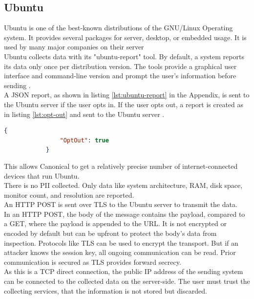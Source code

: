     \subsection{Ubuntu}
        Ubuntu is one of the best-known distributions of the GNU/Linux Operating system. It provides several packages for server, desktop, or embedded usage. It is used by many major companies on their server \cite{canonical_enterprise_nodate}\\
        Ubuntu collects data with its "ubuntu-report" tool. By default, a system reports its data only once per distribution version. The tools provide a graphical user interface and command-line version and prompt the user's information before sending \cite{roche_ubuntuubuntu-report_2020}.\\
        A JSON report, as shown in listing \ref{lst:ubuntu-report} in the Appendix, is sent to the Ubuntu server if the user opts in. If the user opts out, a report is created as in listing \ref{lst:opt-out} and sent to the Ubuntu server \cite{roche_ubuntuubuntu-report_2020}.\\ 
        \begin{lstlisting}[language=json, caption=JSON report on opt out, label=lst:opt-out]
            {
                "OptOut": true
            }
        \end{lstlisting}
        This allows Canonical to get a relatively precise number of internet-connected devices that run Ubuntu.\\
        There is no PII collected. Only data like system architecture, RAM, disk space, monitor count, and resolution are reported.\\
        An HTTP POST is sent over TLS to the Ubuntu server to transmit the data.\\
        
        In an HTTP POST, the body of the message contains the payload, compared to a GET, where the payload is appended to the URL.
        It is not encrypted or encoded by default but can be upfront to protect the body's data from inspection. Protocols like TLS can be used to encrypt the transport. But if an attacker knows the session key, all ongoing communication can be read. Prior communication is secured as TLS provides forward secrecy.\\
        
        As this is a TCP direct connection, the public IP address of the sending system can be connected to the collected data on the server-side.
        The user must trust the collecting services, that the information is not stored but discarded.\\
        
